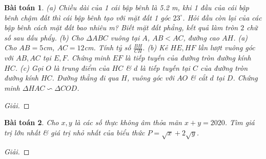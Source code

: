\documentclass{article}
\newtheorem{baitoan}{Bài toán}
\begin{document}
\begin{baitoan}
	(a) Chiều dài của 1 cái bập bênh là {\rm5.2 m}, khi 1 đầu của cái bập bênh chậm đất thì cái bập bênh tạo với mặt đất 1 góc $23^\circ$. Hỏi đầu còn lại của các bập bênh cách mặt đất bao nhiêu {\rm m}? Biết mặt đất phẳng, kết quả làm tròn $2$ chữ số sau dấu phẩy. (b) Cho $\Delta ABC$ vuông tại $A$, $AB < AC$, đường cao $AH$. (a) Cho $AB = 5${\rm cm}, $AC = 12${\rm cm}. Tính tỷ số $\frac{BH}{CH}$. (b) Kẻ $HE, HF$ lần lượt vuông góc với $AB,AC$ tại $E,F$. Chứng minh $EF$ là tiếp tuyến của đường tròn đường kính $HC$. (c) Gọi $O$ là trung điểm của $HC$ \& $d$ là tiếp tuyến tại $C$ của đường tròn đường kính $HC$. Đường thẳng đi qua $H$, vuông góc với $AO$ \& cắt $d$ tại $D$. Chứng minh $\Delta HAC\backsim\Delta COD$.
\end{baitoan}

\begin{proof}[Giải]
	
\end{proof}

\begin{baitoan}
	Cho $x,y$ là các số thực không âm thỏa mãn $x + y = 2020$. Tìm giá trị lớn nhất \& giá trị nhỏ nhất của biểu thức $P = \sqrt{x} + 2\sqrt{y}$.
\end{baitoan}

\begin{proof}[Giải]
	
\end{proof}


\printbibliography[heading=bibintoc]
\end{document}
